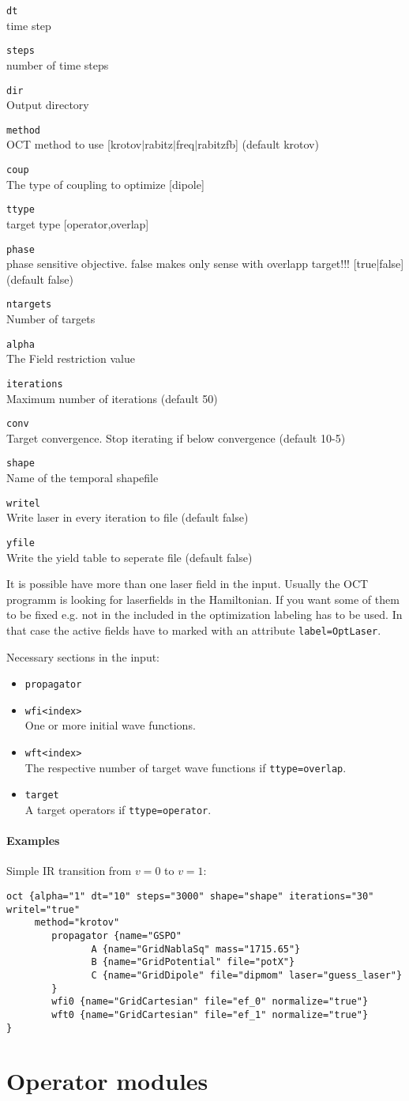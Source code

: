 \documentclass[a4paper,12pt]{scrbook}
\newcommand{\option}[2]{\item \texttt{#1}\\ #2}
\newcommand{\code}[1]{\texttt{#1}}
\begin{document}
\begin{options}
\option{dt}{time step}
\option{steps}{number of time steps}
\option{dir}{Output directory}
\option{method}{OCT method to use [krotov$|$rabitz$|$freq$|$rabitzfb] (default krotov)}
\option{coup}{The type of coupling to optimize [dipole]}
\option{ttype}{target type [operator,overlap]}
\option{phase}{phase sensitive objective. false makes only sense with overlapp target!!! [true|false] (default false)}
\option{ntargets}{Number of targets}
\option{alpha}{The Field restriction value}
\option{iterations}{Maximum number of iterations (default 50)}
\option{conv}{Target convergence. Stop iterating if below convergence (default 10-5)}
\option{shape}{Name of the temporal shapefile}
\option{writel}{Write laser in every iteration to file (default false)}
\option{yfile}{Write the yield table to seperate file (default false)}
\end{options}
It is possible have more than one laser field in the input. Usually the OCT programm
is looking for laserfields in the Hamiltonian. If you want some of them to be fixed e.g. not in
the included in the optimization labeling has to be used.
In that case the active fields have to marked with an attribute \verb|label=OptLaser|.

Necessary sections in the input:
\begin{itemize}
 \option{propagator}{}
 \option{wfi<index>}{One or more initial wave functions.}
 \option{wft<index>}{The respective number of target wave functions if \code{ttype=overlap}.}
 \option{target}{A target operators if \code{ttype=operator}.}
\end{itemize}



\subsubsection*{Examples}
Simple IR transition from $v=0$ to $v=1$:
\begin{verbatim}
oct {alpha="1" dt="10" steps="3000" shape="shape" iterations="30" writel="true"
     method="krotov"
        propagator {name="GSPO"
               A {name="GridNablaSq" mass="1715.65"}
               B {name="GridPotential" file="potX"}
               C {name="GridDipole" file="dipmom" laser="guess_laser"}
        }
        wfi0 {name="GridCartesian" file="ef_0" normalize="true"}
        wft0 {name="GridCartesian" file="ef_1" normalize="true"}
}
\end{verbatim}


\chapter{Operator modules}
\end{document}
